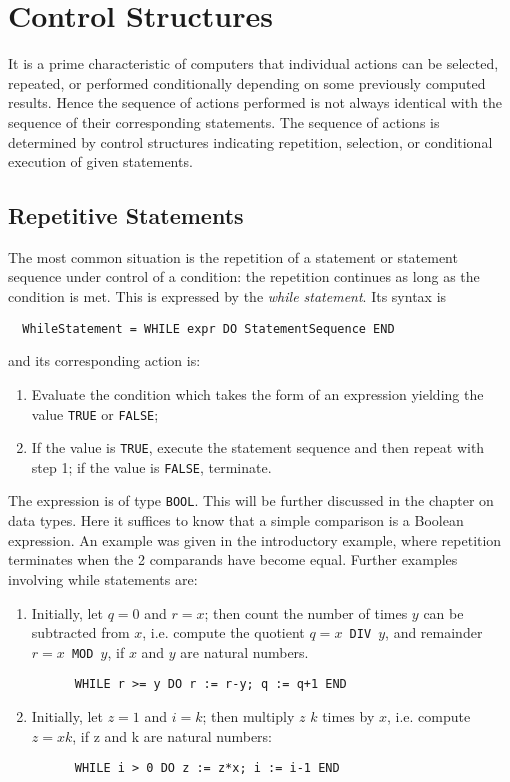\chapter{Control Structures}
It is a prime characteristic of computers that individual actions can be selected, repeated, or
performed conditionally depending on some previously computed results. Hence the sequence of
actions performed is not always identical with the sequence of their corresponding statements. The
sequence of actions is determined by control structures indicating repetition, selection, or
conditional execution of given statements.

\section{Repetitive Statements}
The most common situation is the repetition of a statement or statement sequence under control of
a condition: the repetition continues as long as the condition is met. This is expressed by the 
\emph{while statement}. Its syntax is
\begin{verbatim}
  WhileStatement = WHILE expr DO StatementSequence END
\end{verbatim}
and its corresponding action is:
\begin{enumerate}
  \item Evaluate the condition which takes the form of an expression yielding
    the value \verb|TRUE| or \verb|FALSE|;
  \item If the value is \verb|TRUE|, execute the statement sequence and then repeat with step 1;
    if the value is \verb|FALSE|, terminate.
\end{enumerate}
The expression is of type \verb|BOOL|. This will be further discussed in the chapter on data types.
Here it suffices to know that a simple comparison is a Boolean expression. An example was given
in the introductory example, where repetition terminates when the 2 comparands have become
equal. Further examples involving while statements are:
\begin{enumerate}
  \item Initially, let $q = 0$ and $r = x$; then count the number of times $y$ can be subtracted
    from $x$, i.e. compute the quotient $q = x$\verb| DIV |$y$, and remainder $r = x$\verb| MOD |$y$,
    if $x$ and $y$ are natural numbers.
    \begin{verbatim}
      WHILE r >= y DO r := r-y; q := q+1 END
    \end{verbatim}
  \item Initially, let $z = 1$ and $i = k$; then multiply $z$ $k$ times by $x$, i.e. compute
    $z = xk$, if z and k are natural numbers:
    \begin{verbatim}
      WHILE i > 0 DO z := z*x; i := i-1 END
    \end{verbatim}
\end{enumerate}
